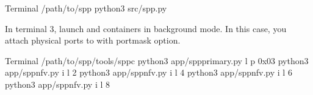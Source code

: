 \documentclass[a4paper,11pt,openany,oneside,english]{sphinxmanual}
\begin{document}
\begin{sphinxVerbatim}[commandchars=\\\{\},formatcom=\footnotesize]
 Terminal 
  /path/to/spp
 python3 src/spp.py
\end{sphinxVerbatim}

In terminal 3, launch  and  containers
in background mode.
In this case, you attach physical ports to  with
portmask option.

\begin{sphinxVerbatim}[commandchars=\\\{\},formatcom=\footnotesize]
 Terminal 
  /path/to/spp/tools/sppc
 python3 app/spp\PYGZhy{}primary.py \PYGZhy{}l  \PYGZhy{}p 0x03
 python3 app/spp\PYGZhy{}nfv.py \PYGZhy{}i  \PYGZhy{}l \PYGZhy{}2
 python3 app/spp\PYGZhy{}nfv.py \PYGZhy{}i  \PYGZhy{}l \PYGZhy{}4
 python3 app/spp\PYGZhy{}nfv.py \PYGZhy{}i  \PYGZhy{}l \PYGZhy{}6
 python3 app/spp\PYGZhy{}nfv.py \PYGZhy{}i  \PYGZhy{}l \PYGZhy{}8
\end{sphinxVerbatim}
\end{document}
